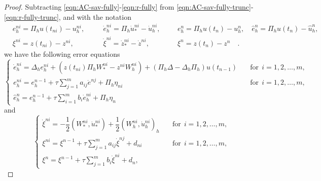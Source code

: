 \documentclass[10pt,final,leqno,onefignum,onetabnum]{siamltex}%
\begin{document}
\begin{proof}
Subtracting \eqref{eqn:AC-sav-fully}-\eqref{eqn:r-fully} from \eqref{eqn:AC-sav-fully-trunc}-\eqref{eqn:r-fully-trunc},
and with the notation
\begin{align*}
  &e_h^{ni} = \Pi_h u(t_{ni}) - u_h^{ni},\quad  &&\dot e_h^{ni} = \Pi_h \dot u_*^{ni} - \dot u_h^{ni},
 &&&  e_h^{n} = \Pi_h u(t_n) - u_h^{n},  \quad  \hat e_h^{n} = \Pi_h u(t_n) - \hat u_h^{n},  \\
 & \xi^{ni} = z(t_{ni}) - z^{ni}, \quad  && \dot \xi^{ni} = \dot z_*^{ni} - \dot z^{ni} ,  &&&  \xi^{n} = z(t_n)- z^n\quad  .
\end{align*}
 we have the following error equations
\begin{equation}\label{eqn:AC-sav-fully-err}
    \begin{cases}
   \dot e_h^{ni} =  \Delta_h e_h^{ni} +  (z(t_{ni}) \Pi_h W_*^{ni} - z^{ni} W_h^{ni}) + (\Pi_h \Delta - \Delta_h \Pi_h) u(t_{n-1})
   &\quad \text{for} ~~i=1,2,\dots,m, \\
   e_h^{ni}=  e_h^{n-1}  + \tau \sum_{j=1}^m a_{ij} \dot e^{nj} + \Pi_h \eta_{ni}&\quad \text{for} ~~i=1,2,\dots,m, \\
 \hat e_h^{n} = e_h^{n-1} + \tau \sum_{i=1}^m b_i \dot e_h^{ni} + \Pi_h \eta_{n}
  \end{cases}
\end{equation}
and
\begin{equation}\label{eqn:r-fully-err}
\begin{cases}
    \dot \xi^{ni} = - \dfrac12(W_*^{ni} ,   \dot u_*^{ni}) + \dfrac12(W_h^{ni} ,   \dot u_h^{ni})_h &\quad \text{for} ~~i=1,2,\dots,m, \\
    \xi^{ni} = \xi^{n-1} + \tau \sum_{j=1}^m a_{ij}  \dot \xi^{nj}+ d_{ni}&\quad \text{for} ~~i=1,2,\dots,m, \\
   \xi^n =\xi^{n-1}  +  \tau \sum_{j=1}^m  b_i  \dot \xi^{ni}+d_{n},
 \end{cases}
\end{equation}


\end{proof}
\end{document}
